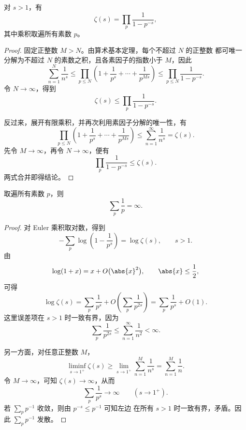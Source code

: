 \begin{theorem}\label{thm:euler-product-zeta-real}
	对 $s>1$，有
	\[
	\zeta(s)=\prod_p\frac1{1-p^{-s}},
	\]
	其中乘积取遍所有素数 $p$。
\end{theorem}

\begin{proof}
	固定正整数 $M>N$。由算术基本定理，每个不超过 $N$ 的正整数
	都可唯一分解为不超过 $N$ 的素数之积，且各素因子的指数小于
	$M$，因此
	\[
	\sum_{n=1}^{N}\frac1{n^s}
	\leq
	\prod_{p\leq N}
	\left(1+\frac1{p^s}+\cdots+\frac1{p^{Ms}}\right)
	\leq
	\prod_{p\leq N}\frac1{1-p^{-s}}.
	\]
	令 $N\to\infty$，得到
	\[
	\zeta(s)\leq\prod_p\frac1{1-p^{-s}}.
	\]

	反过来，展开有限乘积，并再次利用素因子分解的唯一性，有
	\[
	\prod_{p\leq N}
	\left(1+\frac1{p^s}+\cdots+\frac1{p^{Ms}}\right)
	\leq\sum_{n=1}^{\infty}\frac1{n^s}=\zeta(s).
	\]
	先令 $M\to\infty$，再令 $N\to\infty$，便有
	\[
	\prod_p\frac1{1-p^{-s}}\leq\zeta(s).
	\]
	两式合并即得结论。
\end{proof}

\begin{proposition}\label{prop:sum-reciprocals-primes-diverges}
	取遍所有素数 $p$，则
	\[
	\sum_p\frac1p=\infty.
	\]
\end{proposition}

\begin{proof}
	对 Euler 乘积取对数，得到
	\[
	-\sum_p\log\left(1-\frac1{p^s}\right)=\log\zeta(s),
	\qquad s>1.
	\]
	由
	\[
	\log(1+x)=x+O\bigl(\abs{x}^2\bigr),
	\qquad \abs{x}\leq\frac12,
	\]
	可得
	\[
	\log\zeta(s)
	=\sum_p\frac1{p^s}
	+O\left(\sum_p\frac1{p^{2s}}\right)
	=\sum_p\frac1{p^s}+O(1).
	\]
	这里误差项在 $s>1$ 时一致有界，因为
	\[
	\sum_p\frac1{p^{2s}}
	\leq\sum_{n=1}^{\infty}\frac1{n^2}<\infty.
	\]

	另一方面，对任意正整数 $M$，
	\[
	\liminf_{s\to1^+}\zeta(s)
	\geq\lim_{s\to1^+}\sum_{n=1}^{M}\frac1{n^s}
	=\sum_{n=1}^{M}\frac1n.
	\]
	令 $M\to\infty$，可知 $\zeta(s)\to\infty$，从而
	\[
	\sum_p\frac1{p^s}\longrightarrow\infty
	\qquad(s\to1^+).
	\]
	若 $\sum\limits_p p^{-1}$ 收敛，则由 $p^{-s}\leq p^{-1}$ 可知左边
	在所有 $s>1$ 时一致有界，矛盾。因此
	$\sum\limits_p p^{-1}$ 发散。
\end{proof}

